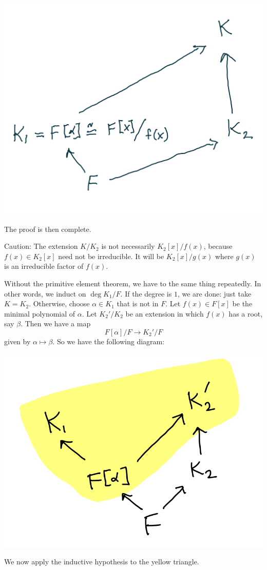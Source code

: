 \documentclass[11pt]{article}
\begin{document}
\begin{center}
\includegraphics[width=.9\linewidth]{assets/Splitting_fields/2023-04-26_09-46-58_screenshot.png}
\end{center}
The proof is then complete.

Caution: The extension \(K/K_2\) is not necessarily \(K_2[x]/f(x)\), because \(f(x) \in K_2[x]\) need not be irreducible.  It will be \(K_2[x]/g(x)\) where \(g(x)\) is an irreducible factor of \(f(x)\).  

Without the primitive element theorem, we have to the same thing repeatedly.
In other words, we induct on \(\deg K_1/F\).
If the degree is \(1\), we are done: just take \(K = K_2\).
Otherwise, choose \(\alpha \in K_{1}\) that is not in \(F\).
Let \(f(x) \in F[x]\) be the minimal polynomial of \(\alpha\).
Let \(K_2'/K_2\) be an extension in which \(f(x)\) has a root, say \(\beta\).
Then we have a map
\[ F[\alpha]/F \to K_{2}'/F\]
given by \(\alpha \mapsto \beta\).
So we have the following diagram:

\begin{center}
\includegraphics[width=.9\linewidth]{assets/Course_notes/2023-04-24_11-54-21_screenshot.png}
\end{center}
We now apply the inductive hypothesis to the yellow triangle.
\end{document}
